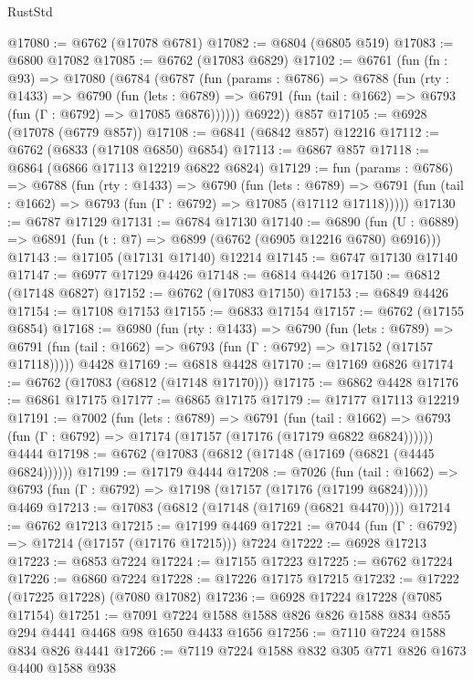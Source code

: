 \begin{lexlean}{RustStd}
\begin{coremodule}
@17080 := @6762 (@17078 @6781)
@17082 := @6804 (@6805 @519)
@17083 := @6800 @17082
@17085 := @6762 (@17083 @6829)
@17102 := @6761
    (fun (fn : @93) =>
    @17080
      (@6784
        (@6787
          (fun (params : @6786) =>
          @6788
            (fun (rty : @1433) =>
            @6790
              (fun (lets : @6789) =>
              @6791 (fun (tail : @1662) => @6793 (fun (Γ : @6792) => @17085 @6876))))))
        @6922))
    @857
@17105 := @6928 (@17078 (@6779 @857))
@17108 := @6841 (@6842 @857) @12216
@17112 := @6762 (@6833 (@17108 @6850) @6854)
@17113 := @6867 @857
@17118 := @6864 (@6866 @17113 @12219 @6822 @6824)
@17129 := fun (params : @6786) =>
  @6788
    (fun (rty : @1433) =>
    @6790
      (fun (lets : @6789) =>
      @6791 (fun (tail : @1662) => @6793 (fun (Γ : @6792) => @17085 (@17112 @17118)))))
@17130 := @6787 @17129
@17131 := @6784 @17130
@17140 := @6890
    (fun (U : @6889) => @6891 (fun (t : @7) => @6899 (@6762 (@6905 @12216 @6780) @6916)))
@17143 := @17105 (@17131 @17140) @12214
@17145 := @6747 @17130 @17140
@17147 := @6977 @17129 @4426
@17148 := @6814 @4426
@17150 := @6812 (@17148 @6827)
@17152 := @6762 (@17083 @17150)
@17153 := @6849 @4426
@17154 := @17108 @17153
@17155 := @6833 @17154
@17157 := @6762 (@17155 @6854)
@17168 := @6980
    (fun (rty : @1433) =>
    @6790
      (fun (lets : @6789) =>
      @6791 (fun (tail : @1662) => @6793 (fun (Γ : @6792) => @17152 (@17157 @17118)))))
    @4428
@17169 := @6818 @4428
@17170 := @17169 @6826
@17174 := @6762 (@17083 (@6812 (@17148 @17170)))
@17175 := @6862 @4428
@17176 := @6861 @17175
@17177 := @6865 @17175
@17179 := @17177 @17113 @12219
@17191 := @7002
    (fun (lets : @6789) =>
    @6791
      (fun (tail : @1662) =>
      @6793 (fun (Γ : @6792) => @17174 (@17157 (@17176 (@17179 @6822 @6824))))))
    @4444
@17198 := @6762 (@17083 (@6812 (@17148 (@17169 (@6821 (@4445 @6824))))))
@17199 := @17179 @4444
@17208 := @7026
    (fun (tail : @1662) => @6793 (fun (Γ : @6792) => @17198 (@17157 (@17176 (@17199 @6824)))))
    @4469
@17213 := @17083 (@6812 (@17148 (@17169 (@6821 @4470))))
@17214 := @6762 @17213
@17215 := @17199 @4469
@17221 := @7044 (fun (Γ : @6792) => @17214 (@17157 (@17176 @17215))) @7224
@17222 := @6928 @17213
@17223 := @6853 @7224
@17224 := @17155 @17223
@17225 := @6762 @17224
@17226 := @6860 @7224
@17228 := @17226 @17175 @17215
@17232 := @17222 (@17225 @17228) (@7080 @17082)
@17236 := @6928 @17224 @17228 (@7085 @17154)
@17251 := @7091 @7224 @1588 @1588 @826 @826 @1588 @834 @855 @294 @4441 @4468 @98 @1650 @4433 @1656
@17256 := @7110 @7224 @1588 @834 @826 @4441
@17266 := @7119 @7224 @1588 @832 @305 @771 @826 @1673 @4400 @1588 @938

\end{coremodule}
\end{lexlean}
